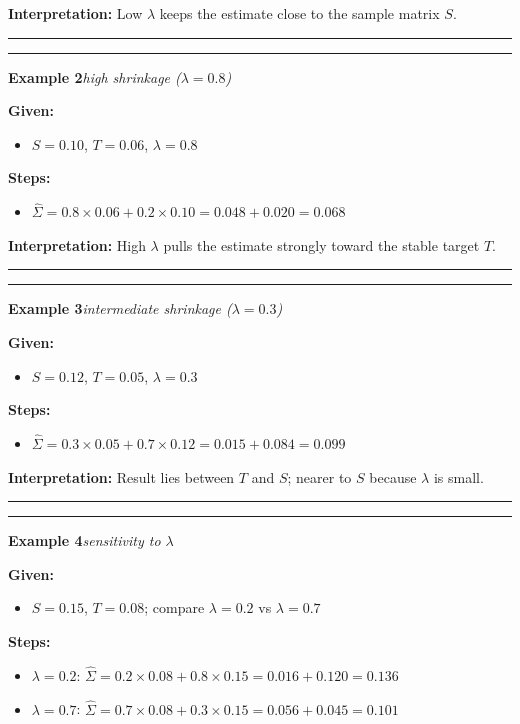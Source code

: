 \documentclass[
]{article}
\begin{document}
\noindent\textbf{Interpretation:} Low $\lambda$ keeps the estimate close to the sample matrix $S$.

\noindent\rule{\linewidth}{0.4pt}
\medskip
\medskip
\noindent\rule{\linewidth}{0.4pt}
\noindent\textbf{Example 2}\enspace\textit{high shrinkage ($\lambda=0.8$)}

\noindent\textbf{Given:}
\begin{itemize}\setlength{\itemsep}{3pt}
  \item $S=0.10$, $T=0.06$, $\lambda=0.8$
\end{itemize}
\noindent\textbf{Steps:}
\begin{itemize}\setlength{\itemsep}{3pt}
  \item $\hat{\Sigma} = 0.8\times0.06 + 0.2\times0.10 = 0.048 + 0.020 = 0.068$
\end{itemize}

\noindent\textbf{Interpretation:} High $\lambda$ pulls the estimate strongly toward the stable target $T$.

\noindent\rule{\linewidth}{0.4pt}
\medskip
\medskip
\noindent\rule{\linewidth}{0.4pt}
\noindent\textbf{Example 3}\enspace\textit{intermediate shrinkage ($\lambda=0.3$)}

\noindent\textbf{Given:}
\begin{itemize}\setlength{\itemsep}{3pt}
  \item $S=0.12$, $T=0.05$, $\lambda=0.3$
\end{itemize}
\noindent\textbf{Steps:}
\begin{itemize}\setlength{\itemsep}{3pt}
  \item $\hat{\Sigma} = 0.3\times0.05 + 0.7\times0.12 = 0.015 + 0.084 = 0.099$
\end{itemize}

\noindent\textbf{Interpretation:} Result lies between $T$ and $S$; nearer to $S$ because $\lambda$ is small.

\noindent\rule{\linewidth}{0.4pt}
\medskip
\medskip
\noindent\rule{\linewidth}{0.4pt}
\noindent\textbf{Example 4}\enspace\textit{sensitivity to $\lambda$}

\noindent\textbf{Given:}
\begin{itemize}\setlength{\itemsep}{3pt}
  \item $S=0.15$, $T=0.08$; compare $\lambda=0.2$ vs $\lambda=0.7$
\end{itemize}
\noindent\textbf{Steps:}
\begin{itemize}\setlength{\itemsep}{3pt}
  \item $\lambda=0.2$: $\hat{\Sigma} = 0.2\times0.08 + 0.8\times0.15 = 0.016+0.120 = 0.136$
  \item $\lambda=0.7$: $\hat{\Sigma} = 0.7\times0.08 + 0.3\times0.15 = 0.056+0.045 = 0.101$
\end{itemize}
\end{document}
